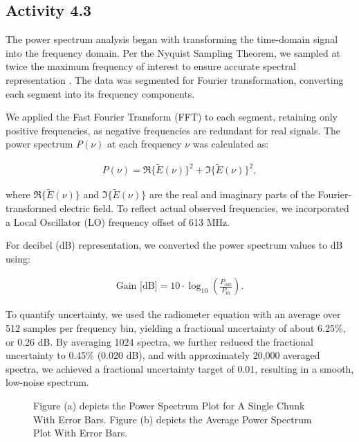 \documentclass[10pt, preprint]{aastex}
\begin{document}
\subsection{Activity 4.3}

The power spectrum analysis began with transforming the time-domain signal into the frequency domain. Per the Nyquist Sampling Theorem, we sampled at twice the maximum frequency of interest to ensure accurate spectral representation \cite{ast325lecture5}. The data was segmented for Fourier transformation, converting each segment into its frequency components.

We applied the Fast Fourier Transform (FFT) to each segment, retaining only positive frequencies, as negative frequencies are redundant for real signals. The power spectrum \( P(\nu) \) at each frequency \( \nu \) was calculated as:

\begin{align}
    P(\nu) = \Re\{ \tilde{E}(\nu) \}^2 + \Im\{ \tilde{E}(\nu) \}^2,
\end{align}

where \( \Re\{ \tilde{E}(\nu) \} \) and \( \Im\{ \tilde{E}(\nu) \} \) are the real and imaginary parts of the Fourier-transformed electric field. To reflect actual observed frequencies, we incorporated a Local Oscillator (LO) frequency offset of 613 MHz.

For decibel (dB) representation, we converted the power spectrum values to dB using:

\begin{align}
    \text{Gain [dB]} = 10 \cdot \log_{10} \left( \frac{P_{\text{out}}}{P_{\text{in}}} \right).
\end{align}

To quantify uncertainty, we used the radiometer equation with an average over 512 samples per frequency bin, yielding a fractional uncertainty of about 6.25\%, or 0.26 dB. By averaging 1024 spectra, we further reduced the fractional uncertainty to 0.45\% (0.020 dB), and with approximately 20,000 averaged spectra, we achieved a fractional uncertainty target of 0.01, resulting in a smooth, low-noise spectrum.


\begin{figure}[H]
  \centering
  \hfill
  \caption{\label{fig:spectrums} Figure (a) depicts the Power Spectrum Plot for A Single Chunk With Error Bars. Figure (b) depicts the Average Power Spectrum Plot With Error Bars. }
\end{figure}
\end{document}
